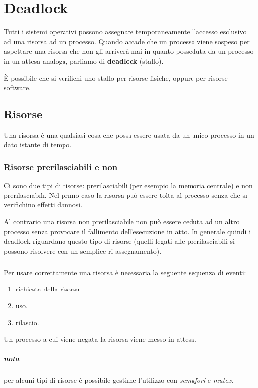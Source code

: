 \chapter{Deadlock}
\thispagestyle{empty}
Tutti i sistemi operativi possono assegnare temporaneamente l'accesso esclusivo ad una risorsa ad un processo. Quando accade che un processo viene sospeso per aspettare una risorsa che non gli arriverà mai in quanto posseduta da un processo in un attesa analoga, parliamo di \textbf{deadlock} (stallo).

È possibile che si verifichi uno stallo per risorse fisiche, oppure per risorse software.

\section{Risorse}
Una risorsa è una qualsiasi cosa che possa essere usata da un unico processo in un dato istante di tempo.

\subsection{Risorse prerilasciabili e non}
Ci sono due tipi di risorse: prerilasciabili (per esempio la memoria centrale) e non prerilasciabili. Nel primo caso la risorsa può essere tolta al processo senza che si verifichino effetti dannosi.

Al contrario una risorsa non prerilasciabile non può essere ceduta ad un altro processo senza provocare il fallimento dell'esecuzione in atto. In generale quindi i deadlock riguardano questo tipo di risorse (quelli legati alle prerilasciabili si possono risolvere con un semplice ri-assegnamento).

\paragraph*{}
Per usare correttamente una risorsa è necessaria la seguente sequenza di eventi:
\begin{enumerate}
    \item richiesta della risorsa.
    \item uso.
    \item rilascio.
\end{enumerate}

Un processo a cui viene negata la risorsa viene messo in attesa.

\paragraph*{nota}
per alcuni tipi di risorse è possibile gestirne l'utilizzo con \textit{semafori} e \textit{mutex}. 

